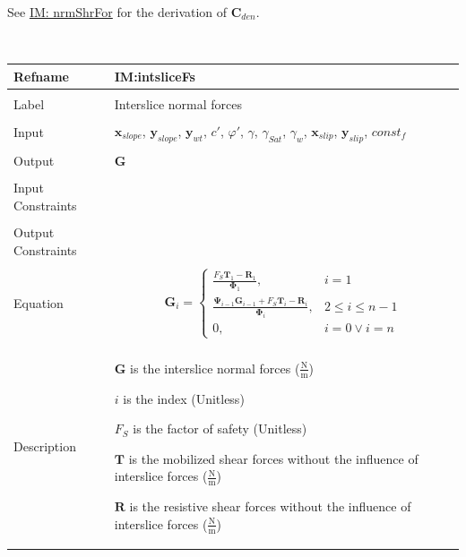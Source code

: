 \documentclass[12pt]{article}
\begin{document}
See \hyperref[IM:nrmShrFor]{IM: nrmShrFor} for the derivation of ${\mathbf{C}_{den}}$.
\par~

\noindent \begin{minipage}{\textwidth}
\begin{tabular}{p{} p{}}
\toprule \textbf{Refname} & \textbf{IM:intsliceFs}
\label{IM:intsliceFs}
\\ \midrule \\
Label & Interslice normal forces
\\ \midrule \\
Input & ${\mathbf{x}_{slope}}$, ${\mathbf{y}_{slope}}$, ${\mathbf{y}_{wt}}$, $c'$, $φ'$, $γ$, ${γ_{Sat}}$, ${γ_{w}}$, ${\mathbf{x}_{slip}}$, ${\mathbf{y}_{slip}}$, $const_f$
\\ \midrule \\
Output & $\mathbf{G}$
\\ \midrule \\
Input Constraints & 
\\ \midrule \\
Output Constraints & 
\\ \midrule \\
Equation & \begin{displaymath}
           {\mathbf{G}}_{i}=\begin{cases}
\frac{{F_{S}} {\mathbf{T}}_{1}-{\mathbf{R}}_{1}}{{\mathbf{Φ}}_{1}}, & i=1\\
\frac{{\mathbf{Ψ}}_{i-1} {\mathbf{G}}_{i-1}+{F_{S}} {\mathbf{T}}_{i}-{\mathbf{R}}_{i}}{{\mathbf{Φ}}_{i}}, & 2\leq{}i\leq{}n-1\\
0, & i=0\lor{}i=n
\end{cases}
           \end{displaymath}
\\ \midrule \\
Description & \begin{symbDescription}
              \item{$\mathbf{G}$ is the interslice normal forces ($\frac{\text{N}}{\text{m}}$)}
              \item{$i$ is the index (Unitless)}
              \item{${F_{S}}$ is the factor of safety (Unitless)}
              \item{$\mathbf{T}$ is the mobilized shear forces without the influence of interslice forces ($\frac{\text{N}}{\text{m}}$)}
              \item{$\mathbf{R}$ is the resistive shear forces without the influence of interslice forces ($\frac{\text{N}}{\text{m}}$)}

\end{symbDescription}
\end{tabular}
\end{minipage}
\end{document}
